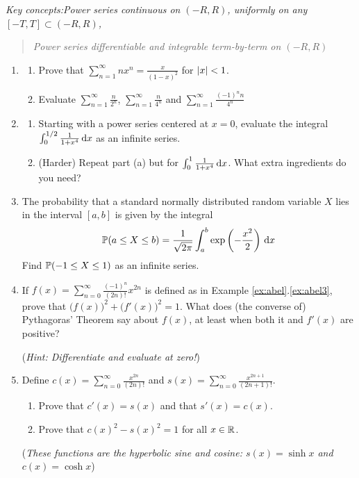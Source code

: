 \clearpage

\begin{exercises}
	\emph{Key concepts:\quad Power series continuous on $(-R,R)$, uniformly on any $[-T,T]\subset(-R,R)$,}
	\begin{quote}
		\emph{Power series differentiable and integrable term-by-term on $(-R,R)$}
	\end{quote}


	\begin{enumerate}
	  \item\begin{enumerate}
			\item Prove that $\sum_{n=1}^\infty nx^n=\frac x{(1-x)^2}$ for $\left| x\right|<1$.
	   	\item Evaluate $\sum_{n=1}^\infty\frac n{2^n}$, $\sum_{n=1}^\infty\frac{n}{4^n}$ and $\sum_{n=1}^\infty\frac{(-1)^nn}{4^n}$
	 \end{enumerate}
	 
	 
	 \item\begin{enumerate}
	   \item Starting with a power series centered at $x=0$, evaluate the integral $\int_0^{1/2}\frac 1{1+x^4}\,{\mathrm{d} x}$ as an infinite series.
	   \item (Harder) Repeat part (a) but for $\int_0^{1}\frac 1{1+x^4}\,{\mathrm{d} x}$. What extra ingredients do you need? 
	 \end{enumerate}
	 
	 
	 \item The probability that a standard normally distributed random variable $X$ lies in the interval $[a,b]$ is given by the integral
	 \[
	 	\mathbb{P}(a\le X\le b)=\frac 1{\sqrt{2\pi}}\int_a^b\exp\left(-\frac{x^2}2\right)\,{\mathrm{d} x}
	 \]
	 Find $\mathbb{P}(-1\le X\le 1)$ as an infinite series.
	 
	 
	 \item If $f(x)=\sum_{n=0}^\infty \frac{(-1)^n}{(2n)!}x^{2n}$ is defined as in Example \ref*{ex:abel}.\ref{ex:abel3}, prove that $\bigl(f(x)\bigr)^2+\bigl(f'(x)\bigr)^2=1$. What does (the converse of) Pythagoras' Theorem say about $f(x)$, at least when both it and $f'(x)$ are positive?\par
	 (\emph{Hint: Differentiate and evaluate at zero!})
	
	
	 \item Define $c(x)=\sum_{n=0}^\infty\frac{x^{2n}}{(2n)!}$ and $s(x)=\sum_{n=0}^\infty\frac{x^{2n+1}}{(2n+1)!}$.
	 \begin{enumerate}
	   \item Prove that $c'(x)=s(x)$ and that $s'(x)=c(x)$.
	   \item Prove that $c(x)^2-s(x)^2=1$ for all $x\in\mathbb{R}$.
	 \end{enumerate}
	 (\emph{These functions are the hyperbolic sine and cosine: $s(x)=\sinh x$ and $c(x)=\cosh x$})
	 

\end{enumerate}
\end{exercises}
